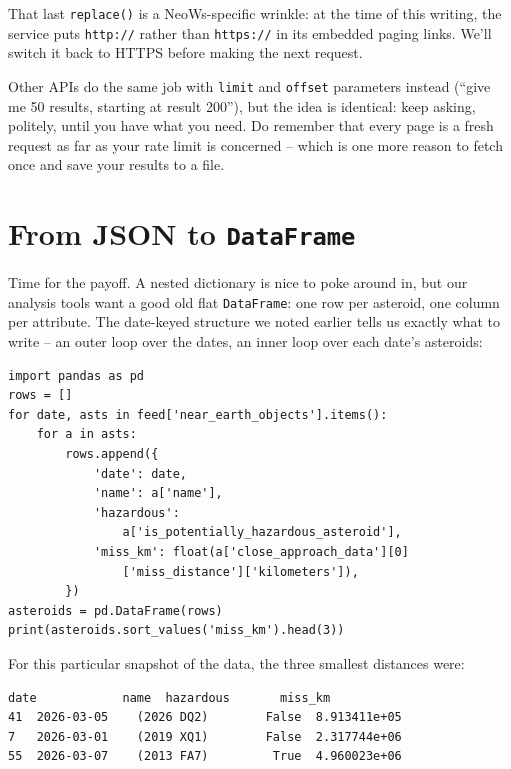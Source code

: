That last \texttt{replace()} is a NeoWs-specific wrinkle: at the time of this
writing, the service puts \texttt{http://} rather than \texttt{https://} in
its embedded paging links. We'll switch it back to HTTPS before making the
next request.

Other APIs do the same job with \texttt{limit} and \texttt{offset} parameters
instead (``give me 50 results, starting at result 200''), but the idea is
identical: keep asking, politely, until you have what you need. Do remember
that every page is a fresh request as far as your rate limit is concerned --
which is one more reason to fetch once and save your results to a file.

\section{From JSON to \texttt{DataFrame}}

Time for the payoff. A nested dictionary is nice to poke around in, but our
analysis tools want a good old flat \texttt{DataFrame}: one row per asteroid,
one column per attribute. The date-keyed structure we noted earlier tells us
exactly what to write -- an outer loop over the dates, an inner loop over each
date's asteroids:

\begin{Verbatim}[fontsize=\small,samepage=true,frame=single,framesep=3mm]
import pandas as pd
rows = []
for date, asts in feed['near_earth_objects'].items():
    for a in asts:
        rows.append({
            'date': date,
            'name': a['name'],
            'hazardous':
                a['is_potentially_hazardous_asteroid'],
            'miss_km': float(a['close_approach_data'][0]
                ['miss_distance']['kilometers']),
        })
asteroids = pd.DataFrame(rows)
print(asteroids.sort_values('miss_km').head(3))
\end{Verbatim}
\vspace{-.2in}

For this particular snapshot of the data, the three smallest distances were:

\begin{Verbatim}[fontsize=\small,samepage=true,frame=leftline,framesep=5mm,framerule=1mm]
          date            name  hazardous       miss_km
41  2026-03-05    (2026 DQ2)        False  8.913411e+05
7   2026-03-01    (2019 XQ1)        False  2.317744e+06
55  2026-03-07    (2013 FA7)         True  4.960023e+06
\end{Verbatim}

